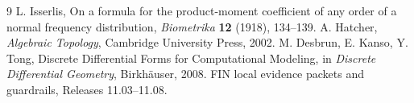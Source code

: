 \documentclass[11pt,a4paper]{article}
\begin{document}
\begin{thebibliography}{9}
 L. Isserlis, On a formula for the product-moment
coefficient of any order of a normal frequency distribution,
\emph{Biometrika} \textbf{12} (1918), 134--139.
 A. Hatcher, \emph{Algebraic Topology}, Cambridge University
Press, 2002.
 M. Desbrun, E. Kanso, Y. Tong, Discrete Differential Forms for
Computational Modeling, in \emph{Discrete Differential Geometry},
Birkh\"auser, 2008.
 FIN local evidence packets and guardrails, Releases
11.03--11.08.
\end{thebibliography}
\end{document}
